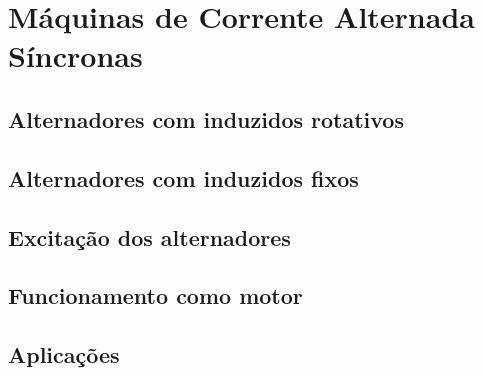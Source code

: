\section{Máquinas de Corrente Alternada Síncronas}



\subsection{Alternadores com induzidos rotativos}



\subsection{Alternadores com induzidos fixos}



\subsection{Excitação dos alternadores}



\subsection{Funcionamento como motor}



\subsection{Aplicações}



